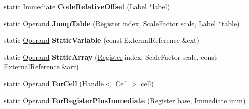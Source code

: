 \begin{DoxyCompactItemize}
\item 
static \hyperlink{classv8_1_1internal_1_1_immediate}{Immediate} {\bfseries Code\+Relative\+Offset} (\hyperlink{classv8_1_1internal_1_1_label}{Label} $\ast$label)\hypertarget{classv8_1_1internal_1_1_b_a_s_e___e_m_b_e_d_d_e_d_a005e754d4c9b6bf1106d7a293c408f34}{}\label{classv8_1_1internal_1_1_b_a_s_e___e_m_b_e_d_d_e_d_a005e754d4c9b6bf1106d7a293c408f34}

\item 
static \hyperlink{classv8_1_1internal_1_1_operand}{Operand} {\bfseries Jump\+Table} (\hyperlink{structv8_1_1internal_1_1_register}{Register} index, Scale\+Factor scale, \hyperlink{classv8_1_1internal_1_1_label}{Label} $\ast$table)\hypertarget{classv8_1_1internal_1_1_b_a_s_e___e_m_b_e_d_d_e_d_a3b93d60e43f7114a226747883179ce93}{}\label{classv8_1_1internal_1_1_b_a_s_e___e_m_b_e_d_d_e_d_a3b93d60e43f7114a226747883179ce93}

\item 
static \hyperlink{classv8_1_1internal_1_1_operand}{Operand} {\bfseries Static\+Variable} (const External\+Reference \&ext)\hypertarget{classv8_1_1internal_1_1_b_a_s_e___e_m_b_e_d_d_e_d_a53aacd4ffa7134fcc2dcbc856eed719e}{}\label{classv8_1_1internal_1_1_b_a_s_e___e_m_b_e_d_d_e_d_a53aacd4ffa7134fcc2dcbc856eed719e}

\item 
static \hyperlink{classv8_1_1internal_1_1_operand}{Operand} {\bfseries Static\+Array} (\hyperlink{structv8_1_1internal_1_1_register}{Register} index, Scale\+Factor scale, const External\+Reference \&arr)\hypertarget{classv8_1_1internal_1_1_b_a_s_e___e_m_b_e_d_d_e_d_ab632b1c79c03685d1e3b3026591a66b6}{}\label{classv8_1_1internal_1_1_b_a_s_e___e_m_b_e_d_d_e_d_ab632b1c79c03685d1e3b3026591a66b6}

\item 
static \hyperlink{classv8_1_1internal_1_1_operand}{Operand} {\bfseries For\+Cell} (\hyperlink{classv8_1_1internal_1_1_handle}{Handle}$<$ \hyperlink{classv8_1_1internal_1_1_cell}{Cell} $>$ cell)\hypertarget{classv8_1_1internal_1_1_b_a_s_e___e_m_b_e_d_d_e_d_acc59c27da82906f4d37271d06257c7d4}{}\label{classv8_1_1internal_1_1_b_a_s_e___e_m_b_e_d_d_e_d_acc59c27da82906f4d37271d06257c7d4}

\item 
static \hyperlink{classv8_1_1internal_1_1_operand}{Operand} {\bfseries For\+Register\+Plus\+Immediate} (\hyperlink{structv8_1_1internal_1_1_register}{Register} base, \hyperlink{classv8_1_1internal_1_1_immediate}{Immediate} imm)\hypertarget{classv8_1_1internal_1_1_b_a_s_e___e_m_b_e_d_d_e_d_a81a55e9c7ef99f3c2e5e211c309b184b}{}\label{classv8_1_1internal_1_1_b_a_s_e___e_m_b_e_d_d_e_d_a81a55e9c7ef99f3c2e5e211c309b184b}


\end{DoxyCompactItemize}
